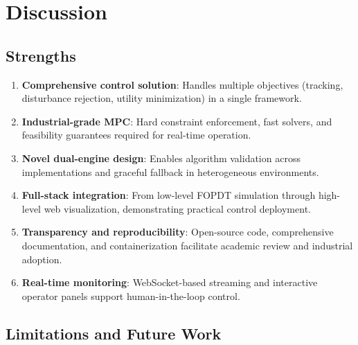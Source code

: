 \documentclass[conference]{IEEEtran}
\begin{document}
\section{Discussion}

\subsection{Strengths}

\begin{enumerate}
\item \textbf{Comprehensive control solution}: Handles multiple objectives (tracking, disturbance rejection, utility minimization) in a single framework.

\item \textbf{Industrial-grade MPC}: Hard constraint enforcement, fast solvers, and feasibility guarantees required for real-time operation.

\item \textbf{Novel dual-engine design}: Enables algorithm validation across implementations and graceful fallback in heterogeneous environments.

\item \textbf{Full-stack integration}: From low-level FOPDT simulation through high-level web visualization, demonstrating practical control deployment.

\item \textbf{Transparency and reproducibility}: Open-source code, comprehensive documentation, and containerization facilitate academic review and industrial adoption.

\item \textbf{Real-time monitoring}: WebSocket-based streaming and interactive operator panels support human-in-the-loop control.
\end{enumerate}

\subsection{Limitations and Future Work}
\end{document}
